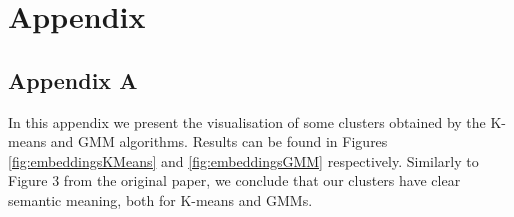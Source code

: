 \newpage
\section{Appendix}
\subsection{Appendix A}
In this appendix we present the visualisation of some clusters obtained by the K-means and GMM algorithms. Results can be found in Figures \ref{fig:embeddingsKMeans} and \ref{fig:embeddingsGMM} respectively. Similarly to Figure 3 from the original paper, we conclude that our clusters have clear semantic meaning, both for K-means and GMMs. 

\begin{figure}[h]
\centering
 \\

\end{figure}
